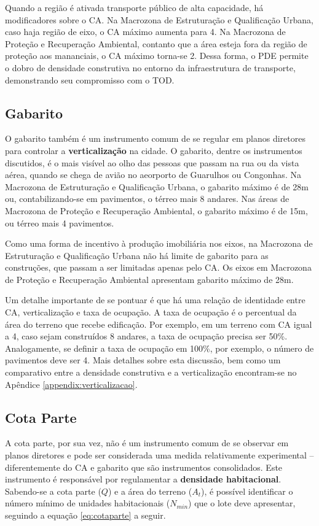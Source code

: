 Quando a região é ativada transporte público de alta capacidade, há modificadores sobre o CA. Na Macrozona de Estruturação e Qualificação Urbana, caso haja região de eixo, o CA máximo aumenta para 4. Na Macrozona de Proteção e Recuperação Ambiental, contanto que a área esteja fora da região de proteção aos mananciais, o CA máximo torna-se 2. Dessa forma, o PDE permite o dobro de densidade construtiva no entorno da infraestrutura de transporte, demonstrando seu compromisso com o TOD.

\subsection*{Gabarito}

O gabarito também é um instrumento comum de se regular em planos diretores para controlar a \textbf{verticalização} na cidade. O gabarito, dentre os instrumentos discutidos, é o mais visível ao olho das pessoas que passam na rua ou da vista aérea, quando se chega de avião no aeorporto de Guarulhos ou Congonhas. Na Macrozona de Estruturação e Qualificação Urbana, o gabarito máximo é de 28m ou, contabilizando-se em pavimentos, o térreo mais 8 andares. Nas áreas de Macrozona de Proteção e Recuperação Ambiental, o gabarito máximo é de 15m, ou térreo mais 4 pavimentos.

Como uma forma de incentivo à produção imobiliária nos eixos, na Macrozona de Estruturação e Qualificação Urbana não há limite de gabarito para as construções, que passam a ser limitadas apenas pelo CA. Os eixos em Macrozona de Proteção e Recuperação Ambiental apresentam gabarito máximo de 28m.

Um detalhe importante de se pontuar é que há uma relação de identidade entre CA, verticalização e taxa de ocupação. A taxa de ocupação é o percentual da área do terreno que recebe edificação. Por exemplo, em um terreno com CA igual a 4, caso sejam construídos 8 andares, a taxa de ocupação precisa ser 50\%. Analogamente, se definir a taxa de ocupação em 100\%, por exemplo, o número de pavimentos deve ser 4. Mais detalhes sobre esta discussão, bem como um comparativo entre a densidade construtiva e a verticalização encontram-se no Apêndice \ref{appendix:verticalizacao}.

\subsection*{Cota Parte}

A cota parte, por sua vez, não é um instrumento comum de se observar em planos diretores e pode ser considerada uma medida relativamente experimental -- diferentemente do CA e gabarito que são instrumentos consolidados. Este instrumento é responsável por regulamentar a \textbf{densidade habitacional}. Sabendo-se a cota parte ($Q$) e a área do terreno ($A_t$), é possível identificar o número mínimo de unidades habitacionais ($N_{min}$) que o lote deve apresentar, seguindo a equação \ref{eq:cotaparte} a seguir. 

